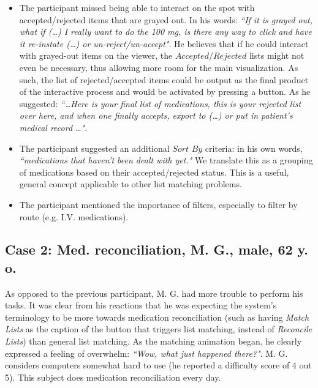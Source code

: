 \documentclass{chi2009}
\newcommand{\AcceptedRejected}{\textit{Accepted/Rejected}}
\newcommand{\SortBy}{\textit{Sort By}}
\begin{document}
\begin{itemize}
\item The participant missed being able to interact on the spot with accepted/rejected items that are grayed out. In his words: \textit{``If it is grayed out, what if (\dots) I really want to do the 100 mg, is there any way to click and have it re-instate (\dots) or un-reject/un-accept"}. He believes that if he could interact with grayed-out items on the viewer, the $\AcceptedRejected$ lists might not even be necessary, thus allowing more room for the main visualization. As such, the list of rejected/accepted items could be output as the final product of the interactive process and would be activated by pressing a button. As he suggested: \textit{``\dots Here is your final list of medications, this is your rejected list over here, and when one finally accepts, export to (\dots) or put in patient's medical record \dots"}.
\item The participant suggested an additional $\SortBy$ criteria: in his own words, \textit{``medications that haven't been dealt with yet."} We translate this as a grouping of medications based on their accepted/rejected status. This is a useful, general concept applicable to other list matching problems.
\item The participant mentioned the importance of filters, especially to filter by route (e.g. I.V. medications).  
\end{itemize}

\subsection{Case 2: Med. reconciliation, M. G., male, 62 y. o.}

As opposed to the previous participant, M. G. had more trouble to perform his tasks. It was clear from his reactions that he was expecting the system's terminology to be more towards medication reconciliation (such as having \textit{Match Lists} as the caption of the button that triggers list matching, instead of \textit{Reconcile Lists}) than general list matching. As the matching animation began, he clearly expressed a feeling of overwhelm: \textit{``Wow, what just happened there?"}. M. G. considers computers somewhat hard to use (he reported a difficulty score of 4 out 5). This subject does medication reconciliation every day. 
\end{document}

